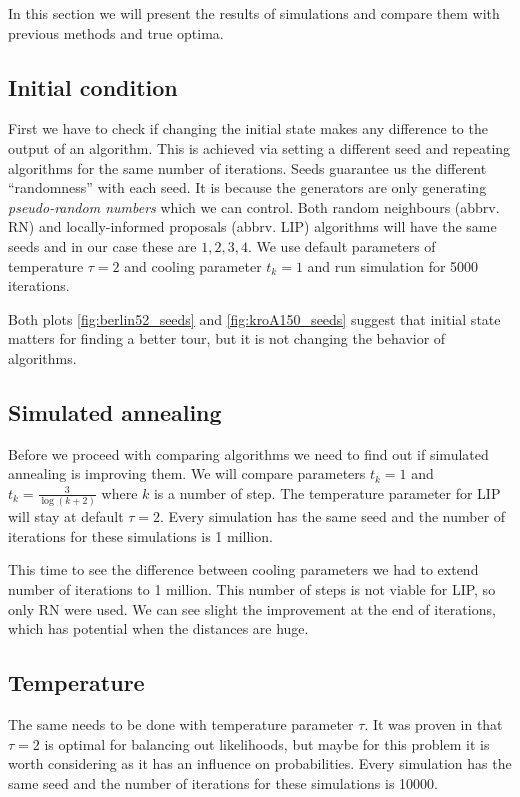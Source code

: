 In this section we will present the results of simulations and compare them with previous methods and true optima.

\subsection{Initial condition}
	First we have to check if changing the initial state makes any difference to the output of an algorithm. This is achieved via setting a different seed and repeating algorithms for the same number of iterations. Seeds guarantee us the different ``randomness'' with each seed. It is because the generators are only generating \textit{pseudo-random numbers} which we can control. Both random neighbours (abbrv. RN) and locally-informed proposals (abbrv. LIP) algorithms will have the same seeds and in our case these are $1,2,3,4$. We use default parameters of temperature $\tau=2$ and cooling parameter $t_k=1$ and run simulation for 5000 iterations.
	

	Both plots \ref{fig:berlin52_seeds} and \ref{fig:kroA150_seeds} suggest that initial state matters for finding a better tour, but it is not changing the behavior of algorithms.
	
\subsection{Simulated annealing}
	Before we proceed with comparing algorithms we need to find out if simulated annealing is improving them. We will compare parameters $t_k=1$ and $t_k= \frac{3}{\log(k+2)}$ where $k$ is a number of step. The temperature parameter for LIP will stay at default $\tau=2$. Every simulation has the same seed and the number of iterations for these simulations is 1 million.
	
	
	
	This time to see the difference between cooling parameters we had to extend number of iterations to 1 million. This number of steps is not viable for LIP, so only RN were used. We can see slight the improvement at the end of iterations, which has potential when the distances are huge. 
	
\subsection{Temperature}
	The same needs to be done with temperature parameter $\tau$. It was proven in \cite{zanella2020informed} that $\tau=2$ is optimal for balancing out likelihoods, but maybe for this problem it is worth considering as it has an influence on probabilities. Every simulation has the same seed and the number of iterations for these simulations is 10000.
	
